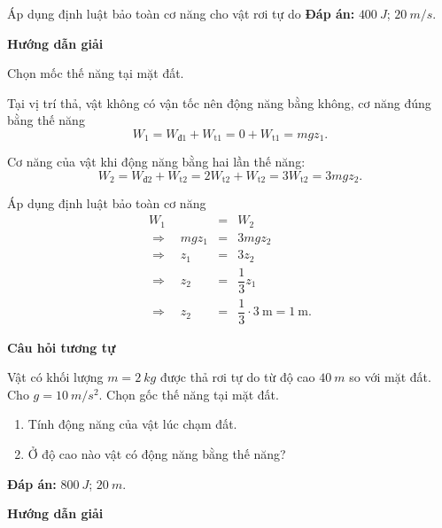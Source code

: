 \begin{dang}{Áp dụng định luật bảo toàn cơ năng cho vật rơi tự do }
{		\textbf{Đáp án:} $\SI{400}{J}$; $\SI{20}{m/s}$.
	}
	{	\begin{center}
			\textbf{Hướng dẫn giải}
		\end{center}
		
		Chọn mốc thế năng tại mặt đất.
		
		Tại vị trí thả, vật không có vận tốc nên động năng bằng không, cơ năng đúng bằng thế năng
		\begin{equation*}
			W_1=W_\text{đ1}+W_\text{t1}=0+W_\text{t1}=mgz_1.
		\end{equation*}
		
		Cơ năng của vật khi động năng bằng hai lần thế năng:
		\begin{equation*}
			W_2=W_\text{đ2}+W_\text{t2}=2W_\text{t2}+W_\text{t2}=3W_\text{t2}=3mgz_2.
		\end{equation*}
		
		Áp dụng định luật bảo toàn cơ năng
		\begin{eqnarray*}
			W_1&=&W_2\\
			\Rightarrow\quad mgz_1 &=& 3mgz_2\\
			\Rightarrow\quad z_1 &=& 3z_2\\
			\Rightarrow\quad z_2 &=& \dfrac{1}{3}z_1\\
			\Rightarrow\quad z_2 &=&\dfrac{1}{3}\cdot \SI{3}{\meter}=\SI{1}{\meter}.
		\end{eqnarray*}
		
		\begin{center}
			\textbf{Câu hỏi tương tự}
		\end{center}
		
		Vật có khối lượng $m=\SI{2}{kg}$ được thả rơi tự do từ độ cao $\SI{40}{m}$ so với mặt đất. Cho $g=\SI{10}{m/s^2}$. Chọn gốc thế năng tại mặt đất.
		\begin{enumerate}[label=\alph*)]
			\item Tính động năng của vật lúc chạm đất.
			\item Ở độ cao nào vật có động năng bằng thế năng?
		\end{enumerate}
		
		\textbf{Đáp án:} $\SI{800}{J}$; $\SI{20}{m}$.
	}
	{\begin{center}
			\textbf{Hướng dẫn giải}
		\end{center}
		
}
\end{dang}
